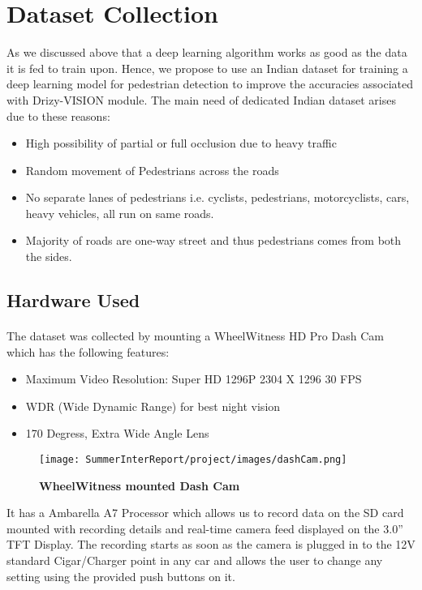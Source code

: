 \section{Dataset Collection}
As we discussed above that a deep learning algorithm works as good as the data it is fed to train upon. Hence, we propose to use an Indian dataset for training a deep learning model for pedestrian detection to improve the accuracies associated with Drizy-VISION module. The main need of dedicated Indian dataset arises due to these reasons:
\begin{itemize}
     \item High possibility of partial or full occlusion due to heavy traffic
     \item Random movement of Pedestrians across the roads
     \item No separate lanes of pedestrians i.e. cyclists, pedestrians, motorcyclists, cars, heavy vehicles, all run on same roads.
     \item Majority of roads are one-way street and thus pedestrians comes from both the sides.
\end{itemize}
\subsection{Hardware Used}
\paragraph{} The dataset was collected by mounting a WheelWitness HD Pro Dash Cam which has the following features: \\
\begin{itemize}
\item Maximum Video Resolution: Super HD 1296P 2304 X 1296 30 FPS
\item WDR (Wide Dynamic Range) for best night vision
\item 170 Degress, Extra Wide Angle Lens
\end{itemize}
\begin{figure}
\centering
\texttt{[image: SummerInterReport/project/images/dashCam.png]}
\caption{\textbf{WheelWitness mounted Dash Cam}}
\end{figure}

It has a Ambarella A7 Processor which allows us to record data on the SD card mounted with recording details and real-time camera feed displayed on the 3.0'' TFT Display. The recording starts as soon as the camera is plugged in to the 12V standard Cigar/Charger point in any car and allows the user to change any setting using the provided push buttons on it.
